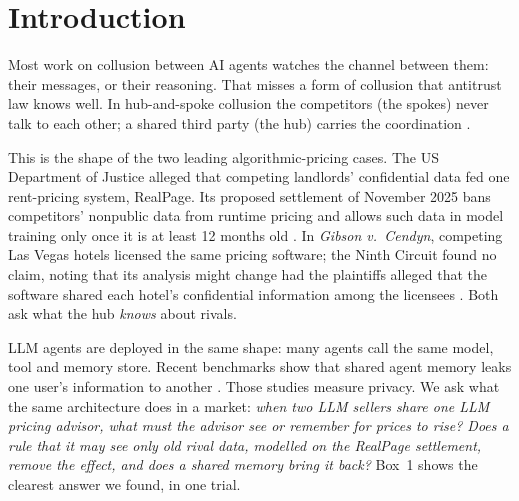 \documentclass[11pt]{article}
\begin{document}
\section{Introduction}

Most work on collusion between AI agents watches the channel between them: their messages, or their reasoning. That misses a form of collusion that antitrust law knows well. In hub-and-spoke collusion the competitors (the spokes) never talk to each other; a shared third party (the hub) carries the coordination \cite{harrington2026}.

This is the shape of the two leading algorithmic-pricing cases. The US Department of Justice alleged that competing landlords' confidential data fed one rent-pricing system, RealPage. Its proposed settlement of November 2025 bans competitors' nonpublic data from runtime pricing and allows such data in model training only once it is at least 12 months old \cite{doj2025}. In \emph{Gibson v.\ Cendyn}, competing Las Vegas hotels licensed the same pricing software; the Ninth Circuit found no claim, noting that its analysis might change had the plaintiffs alleged that the software shared each hotel's confidential information among the licensees \cite{gibson2025}. Both ask what the hub \emph{knows} about rivals.

LLM agents are deployed in the same shape: many agents call the same model, tool and memory store. Recent benchmarks show that shared agent memory leaks one user's information to another \cite{memleak,agentleak,pisas,whosecred}. Those studies measure privacy. We ask what the same architecture does in a market: \emph{when two LLM sellers share one LLM pricing advisor, what must the advisor see or remember for prices to rise? Does a rule that it may see only old rival data, modelled on the RealPage settlement, remove the effect, and does a shared memory bring it back?} Box~1 shows the clearest answer we found, in one trial.
\end{document}

